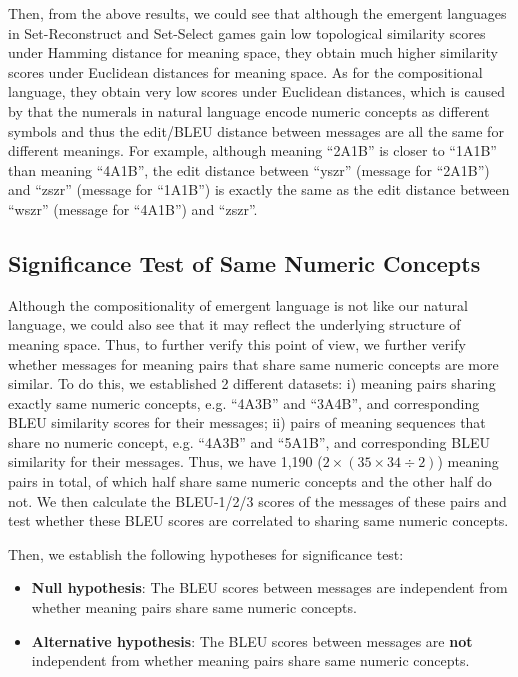 Then, from the above results, we could see that although the emergent languages in Set-Reconstruct and Set-Select games gain low topological similarity scores under Hamming distance for meaning space, they obtain much higher similarity scores under Euclidean distances for meaning space. As for the compositional language, they obtain very low scores under Euclidean distances, which is caused by that the numerals in natural language encode numeric concepts as different symbols and thus the edit/BLEU distance between messages are all the same for different meanings. For example, although meaning ``2A1B'' is closer to ``1A1B'' than meaning ``4A1B'', the edit distance between ``yszr'' (message for ``2A1B'') and ``zszr'' (message for ``1A1B'') is exactly the same as the edit distance between ``wszr'' (message for ``4A1B'') and ``zszr''.

\subsection{Significance Test of Same Numeric Concepts}
\label{ssec4.2.3:significance_test}

Although the compositionality of emergent language is not like our natural language, we could also see that it may reflect the underlying structure of meaning space. Thus, to further verify this point of view, we further verify whether messages for meaning pairs that share same numeric concepts are more similar. To do this, we established 2 different datasets: i) meaning pairs sharing exactly same numeric concepts, e.g. ``4A3B'' and ``3A4B'', and corresponding BLEU similarity scores for their messages; ii) pairs of meaning sequences that share no numeric concept, e.g. ``4A3B'' and ``5A1B'', and corresponding BLEU similarity for their messages. Thus, we have 1,190 ($2 \times (35 \times 34 \div 2)$) meaning pairs in total, of which half share same numeric concepts and the other half do not. We then calculate the BLEU-1/2/3 scores of the messages of these pairs and test whether these BLEU scores are correlated to sharing same numeric concepts. 

Then, we establish the following hypotheses for significance test:

\begin{itemize}
    \item \textbf{Null hypothesis}: The BLEU scores between messages are independent from whether meaning pairs share same numeric concepts.
    \item \textbf{Alternative hypothesis}: The BLEU scores between messages are \textbf{not} independent from whether meaning pairs share same numeric concepts.
\end{itemize}

